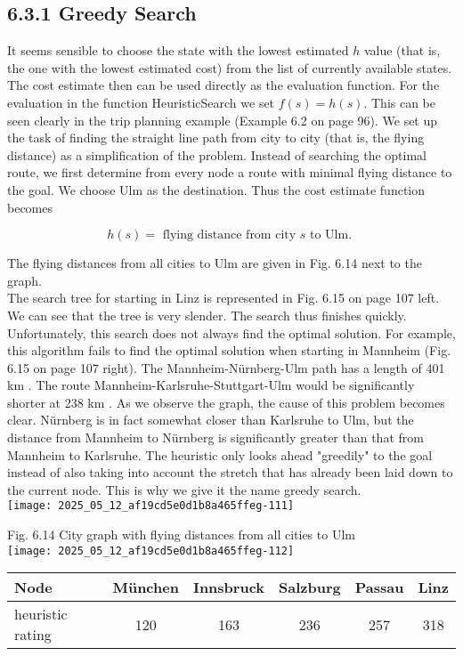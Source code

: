 \documentclass[10pt]{article}
\begin{document}
\subsection*{6.3.1 Greedy Search}
It seems sensible to choose the state with the lowest estimated $h$ value (that is, the one with the lowest estimated cost) from the list of currently available states. The cost estimate then can be used directly as the evaluation function. For the evaluation in the function HeuristicSearch we set $f(s)=h(s)$. This can be seen clearly in the trip planning example (Example 6.2 on page 96). We set up the task of finding the straight line path from city to city (that is, the flying distance) as a simplification of the problem. Instead of searching the optimal route, we first determine from every node a route with minimal flying distance to the goal. We choose Ulm as the destination. Thus the cost estimate function becomes

$$
h(s)=\text { flying distance from city } s \text { to Ulm. }
$$

The flying distances from all cities to Ulm are given in Fig. 6.14 next to the graph.\\
The search tree for starting in Linz is represented in Fig. 6.15 on page 107 left. We can see that the tree is very slender. The search thus finishes quickly. Unfortunately, this search does not always find the optimal solution. For example, this algorithm fails to find the optimal solution when starting in Mannheim (Fig. 6.15 on page 107 right). The Mannheim-Nürnberg-Ulm path has a length of 401 km . The route Mannheim-Karlsruhe-Stuttgart-Ulm would be significantly shorter at 238 km . As we observe the graph, the cause of this problem becomes clear. Nürnberg is in fact somewhat closer than Karlsruhe to Ulm, but the distance from Mannheim to Nürnberg is significantly greater than that from Mannheim to Karlsruhe. The heuristic only looks ahead "greedily" to the goal instead of also taking into account the stretch that has already been laid down to the current node. This is why we give it the name greedy search.\\
\texttt{[image: 2025\_05\_12\_af19cd5e0d1b8a465ffeg-111]}

Fig. 6.14 City graph with flying distances from all cities to Ulm\\
\texttt{[image: 2025\_05\_12\_af19cd5e0d1b8a465ffeg-112]}

\begin{center}
\begin{tabular}{|l||c|c|c|c|c|}
\hline
Node & München & Innsbruck & Salzburg & Passau & Linz \\
\hline
heuristic rating & 120 & 163 & 236 & 257 & 318 \\
\hline
\end{tabular}
\end{center}
\end{document}
